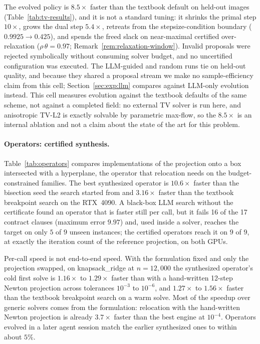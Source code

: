 The evolved policy is $8.5\times$ faster than the textbook default on held-out
images (Table~\ref{tab:tv-results}), and it is not a standard tuning: it
shrinks the primal step $10\times$, grows the dual step $5.4\times$, retreats
from the stepsize-condition boundary ($0.9925 \to 0.425$), and spends the freed
slack on near-maximal certified over-relaxation ($\rho\,\theta = 0.97$;
Remark~\ref{rem:relaxation-window}). Invalid proposals were rejected
symbolically without consuming solver budget, and no uncertified configuration
was executed. The LLM-guided and random runs tie on held-out quality, and
because they shared a proposal stream we make no sample-efficiency claim from
this cell; Section~\ref{sec:exp:llm} compares against LLM-only evolution
instead. This cell measures evolution against the textbook defaults of the
same scheme, not against a completed field: no external TV solver is run here,
and anisotropic TV-L2 is exactly solvable by parametric max-flow, so the
$8.5\times$ is an internal ablation and not a claim about the state of the art
for this problem.

\paragraph{Operators: certified synthesis.}
Table~\ref{tab:operators} compares implementations of the projection onto a box
intersected with a hyperplane, the operator that relocation needs on the
budget-constrained families. The best synthesized operator is $10.6\times$
faster than the bisection seed the search started from and $3.16\times$ faster
than the textbook breakpoint search on the RTX~4090. A black-box LLM search
without the certificate found an operator that is faster still per call, but
it fails 16 of the 17 contract clauses (maximum error $9.97$) and, used inside
a solver, reaches the target on only $5$ of $9$ unseen instances; the
certified operators reach it on $9$ of $9$, at exactly the iteration count of
the reference projection, on both GPUs.

Per-call speed is not end-to-end speed. With the formulation fixed and only the
projection swapped, on knapsack\_ridge at $n = 12{,}000$ the synthesized
operator's cold first solve is $1.16\times$ to $1.29\times$ faster than with a
hand-written 12-step Newton projection across tolerances $10^{-3}$ to
$10^{-6}$, and $1.27\times$ to $1.56\times$ faster than the textbook breakpoint
search on a warm solve. Most of the speedup over generic solvers comes from the
formulation: relocation with the hand-written Newton projection is already
$3.7\times$ faster than the best engine at $10^{-4}$. Operators evolved in a
later agent session match the earlier synthesized ones to within about $5\%$.

